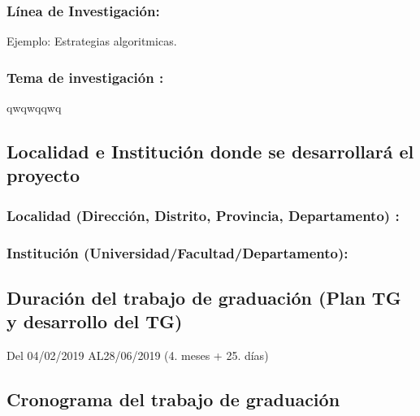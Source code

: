 \documentclass[a4paper, 12pt]{article}
\begin{document}
\subsubsection{Línea de Investigación:} 
Ejemplo: Estrategias algoritmicas.
               
\subsubsection{Tema de investigación :} qwqwqqwq


\subsection{Localidad e Institución donde se desarrollará el proyecto }
  
\subsubsection{Localidad (Dirección, Distrito, Provincia, Departamento) :} 
\subsubsection{Institución (Universidad/Facultad/Departamento):}

  
\subsection{Duración del trabajo de graduación (Plan TG y desarrollo del TG)}
\hspace*{0.7cm}Del \hspace*{0.2cm}04/02/2019 \hspace*{0.3cm} AL\hspace*{0.2cm}28/06/2019  \hspace*{0.2cm}(4. meses +  25. días)
  
      
\subsection{Cronograma del trabajo de graduación}


\end{document}
